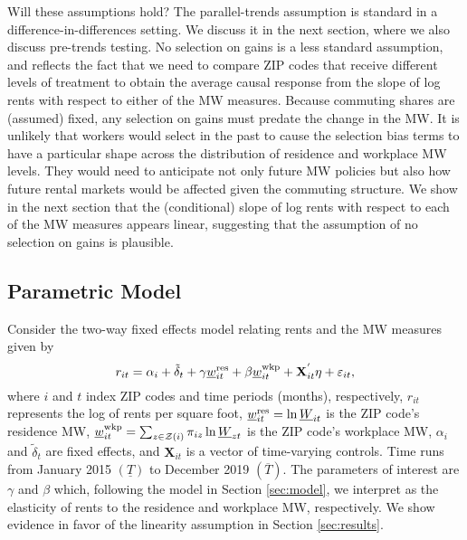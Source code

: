 Will these assumptions hold?
The parallel-trends assumption is standard in a difference-in-differences 
setting.
We discuss it in the next section, where we also discuss pre-trends testing.
No selection on gains is a less standard assumption, and reflects the 
fact that we need to compare ZIP codes that receive different levels 
of treatment to obtain the average causal response from the slope of log 
rents with respect to either of the MW measures.
Because commuting shares are (assumed) fixed, any selection on gains must 
predate the change in the MW.
It is unlikely that workers would select in the past to cause the 
selection bias terms to have a particular shape across the distribution 
of residence and workplace MW levels.
They would need to anticipate not only future MW policies but also how 
future rental markets would be affected given the commuting structure.
We show in the next section that the (conditional) slope of log rents with 
respect to each of the MW measures appears linear, suggesting that the 
assumption of no selection on gains is plausible.

\subsection{Parametric Model}

Consider the two-way fixed effects model relating rents and the MW measures
given by
\begin{equation} \label{eq:func_form}
    r_{it} = \alpha_i + \tilde{\delta}_t 
           + \gamma \underline{w}^{\text{res}}_{it} + \beta \underline{w}^{\text{wkp}}_{it}
           + \mathbf{X}^{'}_{it}\eta
           + \varepsilon_{it} ,
\end{equation}    
where
$i$ and $t$ index ZIP codes and time periods (months), respectively,
$r_{it}$ represents the log of rents per square foot,
$\underline{w}^{\text{res}}_{it} = \ln \underline{W}_{it}$ is the ZIP code's residence MW,
$\underline{w}^{\text{wkp}}_{it} = \sum_{z\in\mathcal{Z}(i)} \pi_{iz}\ln \underline{W}_{zt}$ is the ZIP code's 
workplace MW,
$\alpha_i$ and $\tilde{\delta}_t$ are fixed effects, and 
$\mathbf{X}_{it}$ is a vector of time-varying controls.
Time runs from January 2015 $\left(\underline{T}\right)$ 
to December 2019 $\left(\overline{T}\right)$.
The parameters of interest are $\gamma$ and $\beta$ which, 
following the model in Section \ref{sec:model}, 
we interpret as the elasticity of rents to the residence and workplace MW, 
respectively.
We show evidence in favor of the linearity assumption in Section \ref{sec:results}.


